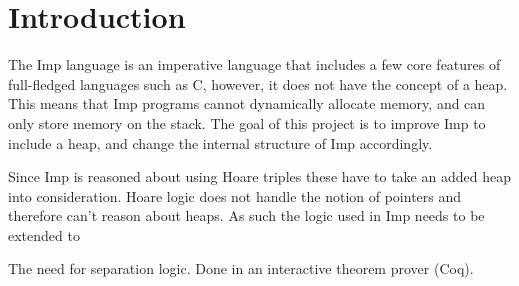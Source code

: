 \section{Introduction}
The Imp language is an imperative language that includes a few core features of full-fledged languages such as C, however, it does not have the concept of a heap. This means that Imp programs cannot dynamically allocate memory, and can only store memory on the stack. The goal of this project is to improve Imp to include a heap, and change the internal structure of Imp accordingly.

Since Imp is reasoned about using Hoare triples these have to take an added heap into consideration. Hoare logic does not handle the notion of pointers and therefore can't reason about heaps. As such the logic used in Imp needs to be extended to 

The need for separation logic.
Done in an interactive theorem prover (Coq).